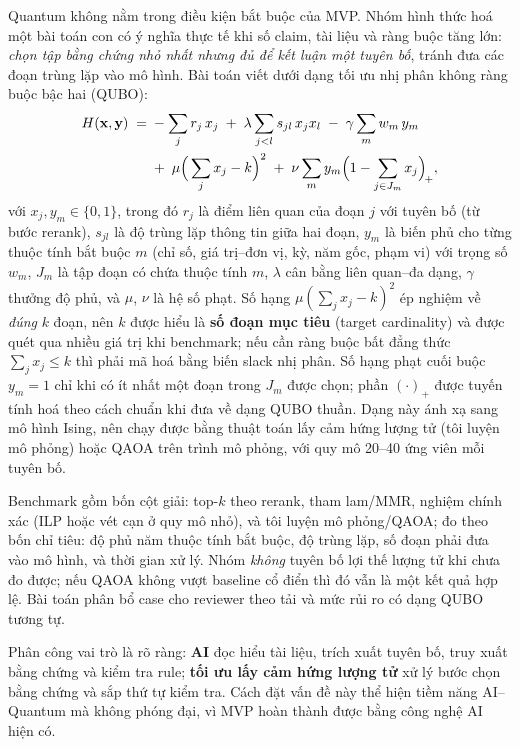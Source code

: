 \documentclass[11pt,a4paper]{article}
\begin{document}
Quantum không nằm trong điều kiện bắt buộc của MVP. Nhóm hình thức hoá một bài toán con có ý nghĩa thực tế khi số claim, tài liệu và ràng buộc tăng lớn: \emph{chọn tập bằng chứng nhỏ nhất nhưng đủ để kết luận một tuyên bố}, tránh đưa các đoạn trùng lặp vào mô hình. Bài toán viết dưới dạng tối ưu nhị phân không ràng buộc bậc hai (QUBO):
\begin{align}
  H(\mathbf{x},\mathbf{y}) \;=\; &-\sum_{j} r_j\,x_j \;+\; \lambda \sum_{j<l} s_{jl}\,x_j x_l \;-\; \gamma \sum_{m} w_m\,y_m \notag\\
  &+\; \mu \Big(\sum_{j} x_j - k\Big)^{2} \;+\; \nu \sum_{m} y_m \Big(1 - \sum_{j \in J_m} x_j\Big)_{\!+},
\end{align}
với $x_j, y_m \in \{0,1\}$, trong đó $r_j$ là điểm liên quan của đoạn $j$ với tuyên bố (từ bước rerank), $s_{jl}$ là độ trùng lặp thông tin giữa hai đoạn, $y_m$ là biến phủ cho từng thuộc tính bắt buộc $m$ (chỉ số, giá trị--đơn vị, kỳ, năm gốc, phạm vi) với trọng số $w_m$, $J_m$ là tập đoạn có chứa thuộc tính $m$, $\lambda$ cân bằng liên quan--đa dạng, $\gamma$ thưởng độ phủ, và $\mu$, $\nu$ là hệ số phạt. Số hạng $\mu(\sum_j x_j - k)^2$ ép nghiệm về \emph{đúng} $k$ đoạn, nên $k$ được hiểu là \textbf{số đoạn mục tiêu} (target cardinality) và được quét qua nhiều giá trị khi benchmark; nếu cần ràng buộc bất đẳng thức $\sum_j x_j \le k$ thì phải mã hoá bằng biến slack nhị phân. Số hạng phạt cuối buộc $y_m = 1$ chỉ khi có ít nhất một đoạn trong $J_m$ được chọn; phần $(\cdot)_+$ được tuyến tính hoá theo cách chuẩn khi đưa về dạng QUBO thuần. Dạng này ánh xạ sang mô hình Ising, nên chạy được bằng thuật toán lấy cảm hứng lượng tử (tôi luyện mô phỏng) hoặc QAOA trên trình mô phỏng, với quy mô 20--40 ứng viên mỗi tuyên bố.

Benchmark gồm bốn cột giải: top-$k$ theo rerank, tham lam/MMR, nghiệm chính xác (ILP hoặc vét cạn ở quy mô nhỏ), và tôi luyện mô phỏng/QAOA; đo theo bốn chỉ tiêu: độ phủ năm thuộc tính bắt buộc, độ trùng lặp, số đoạn phải đưa vào mô hình, và thời gian xử lý. Nhóm \emph{không} tuyên bố lợi thế lượng tử khi chưa đo được; nếu QAOA không vượt baseline cổ điển thì đó vẫn là một kết quả hợp lệ. Bài toán phân bổ case cho reviewer theo tải và mức rủi ro có dạng QUBO tương tự.

Phân công vai trò là rõ ràng: \textbf{AI} đọc hiểu tài liệu, trích xuất tuyên bố, truy xuất bằng chứng và kiểm tra rule; \textbf{tối ưu lấy cảm hứng lượng tử} xử lý bước chọn bằng chứng và sắp thứ tự kiểm tra. Cách đặt vấn đề này thể hiện tiềm năng AI--Quantum mà không phóng đại, vì MVP hoàn thành được bằng công nghệ AI hiện có.
\end{document}
